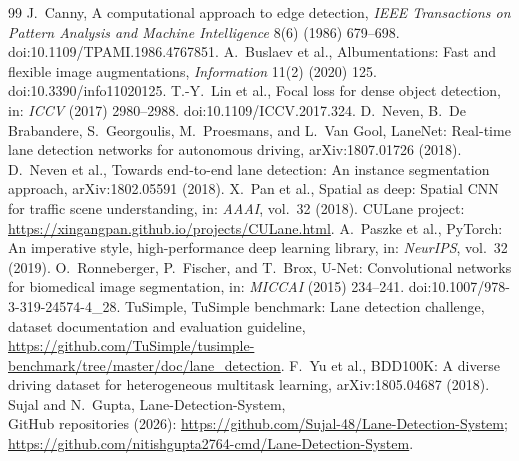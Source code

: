 \documentclass[10pt,a4paper,twocolumn]{article}
\begin{document}
\begin{thebibliography}{99}\footnotesize
{} J.~Canny, A computational approach to edge detection, \emph{IEEE Transactions on Pattern Analysis and Machine Intelligence} 8(6) (1986) 679--698. doi:10.1109/TPAMI.1986.4767851.
 A.~Buslaev et al., Albumentations: Fast and flexible image augmentations, \emph{Information} 11(2) (2020) 125. doi:10.3390/info11020125.
 T.-Y.~Lin et al., Focal loss for dense object detection, in: \emph{ICCV} (2017) 2980--2988. doi:10.1109/ICCV.2017.324.
 D.~Neven, B.~De Brabandere, S.~Georgoulis, M.~Proesmans, and L.~Van Gool, LaneNet: Real-time lane detection networks for autonomous driving, arXiv:1807.01726 (2018).
 D.~Neven et al., Towards end-to-end lane detection: An instance segmentation approach, arXiv:1802.05591 (2018).
 X.~Pan et al., Spatial as deep: Spatial CNN for traffic scene understanding, in: \emph{AAAI}, vol.~32 (2018). CULane project: \url{https://xingangpan.github.io/projects/CULane.html}.
 A.~Paszke et al., PyTorch: An imperative style, high-performance deep learning library, in: \emph{NeurIPS}, vol.~32 (2019).
 O.~Ronneberger, P.~Fischer, and T.~Brox, U-Net: Convolutional networks for biomedical image segmentation, in: \emph{MICCAI} (2015) 234--241. doi:10.1007/978-3-319-24574-4\_28.
 TuSimple, TuSimple benchmark: Lane detection challenge, dataset documentation and evaluation guideline, \url{https://github.com/TuSimple/tusimple-benchmark/tree/master/doc/lane_detection}.
 F.~Yu et al., BDD100K: A diverse driving dataset for heterogeneous multitask learning, arXiv:1805.04687 (2018).
 Sujal and N.~Gupta, Lane-Detection-System,
\\GitHub repositories (2026): \url{https://github.com/Sujal-48/Lane-Detection-System}; \url{https://github.com/nitishgupta2764-cmd/Lane-Detection-System}.
\end{thebibliography}
\end{document}
